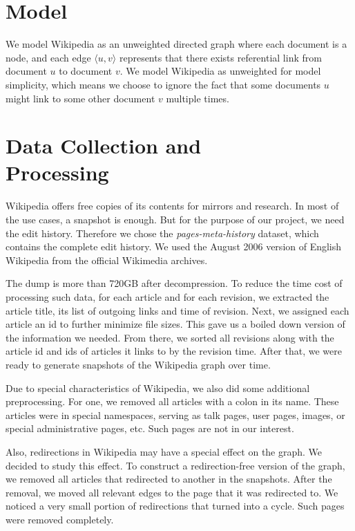 \documentclass[10pt]{article}
\begin{document}
\begin{multicols}{2}
\section{Model}

We model Wikipedia as an unweighted directed graph where each document is a node, and each edge $\langle u, v \rangle$ represents that there exists referential link from document $u$ to document $v$. We model Wikipedia as unweighted for model simplicity, which means we choose to ignore the fact that some documents $u$ might link to some other document $v$ multiple times.


\section{Data Collection and\\ Processing}
Wikipedia offers free copies of its contents for mirrors and research. In most of the use cases, a snapshot is enough. But for the purpose of our project, we need the edit history. Therefore we chose the {\it pages-meta-history} dataset, which contains the complete edit history. We used the August 2006 version of English Wikipedia from the official Wikimedia archives.

The dump is more than 720GB after decompression. To reduce the time cost of processing such data, for each article and for each revision, we extracted the article title, its list of outgoing links and time of revision. Next, we assigned each article an id to further minimize file sizes. This gave us a boiled down version of the information we needed. From there, we sorted all revisions along with the article id and ids of articles it links to by the revision time. After that, we were ready to generate snapshots of the Wikipedia graph over time.

Due to special characteristics of Wikipedia, we also did some additional preprocessing. For one, we removed all articles with a colon in its name. These articles were in special namespaces, serving as talk pages, user pages, images, or special administrative pages, etc. Such pages are not in our interest.

Also, redirections in Wikipedia may have a special effect on the graph. We decided to study this effect. To construct a redirection-free version of the graph, we removed all articles that redirected to another in the snapshots. After the removal, we moved all relevant edges to the page that it was redirected to. We noticed a very small portion of redirections that turned into a cycle. Such pages were removed completely.


\end{multicols}
\end{document}
